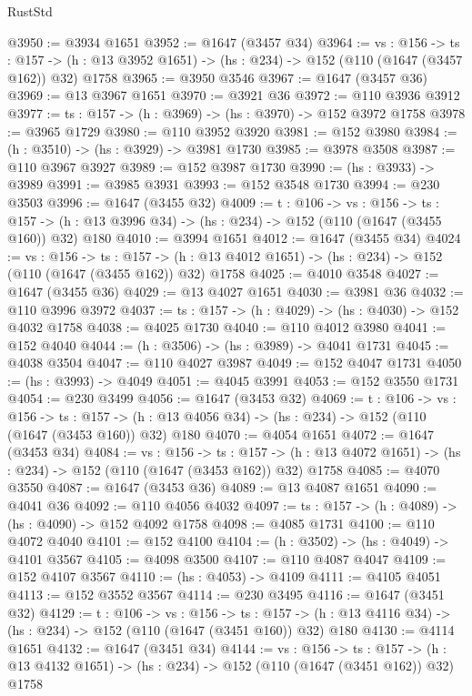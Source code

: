 \begin{lexlean}{RustStd}
\begin{coremodule}
@3950 := @3934 @1651
@3952 := @1647 (@3457 @34)
@3964 := {vs : @156} ->
  {ts : @157} -> (h : @13 @3952 @1651) -> (hs : @234) -> @152 (@110 (@1647 (@3457 @162)) @32) @1758
@3965 := @3950 @3546
@3967 := @1647 (@3457 @36)
@3969 := @13 @3967 @1651
@3970 := @3921 @36
@3972 := @110 @3936 @3912
@3977 := {ts : @157} -> (h : @3969) -> (hs : @3970) -> @152 @3972 @1758
@3978 := @3965 @1729
@3980 := @110 @3952 @3920
@3981 := @152 @3980
@3984 := (h : @3510) -> (hs : @3929) -> @3981 @1730
@3985 := @3978 @3508
@3987 := @110 @3967 @3927
@3989 := @152 @3987 @1730
@3990 := (hs : @3933) -> @3989
@3991 := @3985 @3931
@3993 := @152 @3548 @1730
@3994 := @230 @3503
@3996 := @1647 (@3455 @32)
@4009 := {t : @106} ->
  {vs : @156} ->
  {ts : @157} -> (h : @13 @3996 @34) -> (hs : @234) -> @152 (@110 (@1647 (@3455 @160)) @32) @180
@4010 := @3994 @1651
@4012 := @1647 (@3455 @34)
@4024 := {vs : @156} ->
  {ts : @157} -> (h : @13 @4012 @1651) -> (hs : @234) -> @152 (@110 (@1647 (@3455 @162)) @32) @1758
@4025 := @4010 @3548
@4027 := @1647 (@3455 @36)
@4029 := @13 @4027 @1651
@4030 := @3981 @36
@4032 := @110 @3996 @3972
@4037 := {ts : @157} -> (h : @4029) -> (hs : @4030) -> @152 @4032 @1758
@4038 := @4025 @1730
@4040 := @110 @4012 @3980
@4041 := @152 @4040
@4044 := (h : @3506) -> (hs : @3989) -> @4041 @1731
@4045 := @4038 @3504
@4047 := @110 @4027 @3987
@4049 := @152 @4047 @1731
@4050 := (hs : @3993) -> @4049
@4051 := @4045 @3991
@4053 := @152 @3550 @1731
@4054 := @230 @3499
@4056 := @1647 (@3453 @32)
@4069 := {t : @106} ->
  {vs : @156} ->
  {ts : @157} -> (h : @13 @4056 @34) -> (hs : @234) -> @152 (@110 (@1647 (@3453 @160)) @32) @180
@4070 := @4054 @1651
@4072 := @1647 (@3453 @34)
@4084 := {vs : @156} ->
  {ts : @157} -> (h : @13 @4072 @1651) -> (hs : @234) -> @152 (@110 (@1647 (@3453 @162)) @32) @1758
@4085 := @4070 @3550
@4087 := @1647 (@3453 @36)
@4089 := @13 @4087 @1651
@4090 := @4041 @36
@4092 := @110 @4056 @4032
@4097 := {ts : @157} -> (h : @4089) -> (hs : @4090) -> @152 @4092 @1758
@4098 := @4085 @1731
@4100 := @110 @4072 @4040
@4101 := @152 @4100
@4104 := (h : @3502) -> (hs : @4049) -> @4101 @3567
@4105 := @4098 @3500
@4107 := @110 @4087 @4047
@4109 := @152 @4107 @3567
@4110 := (hs : @4053) -> @4109
@4111 := @4105 @4051
@4113 := @152 @3552 @3567
@4114 := @230 @3495
@4116 := @1647 (@3451 @32)
@4129 := {t : @106} ->
  {vs : @156} ->
  {ts : @157} -> (h : @13 @4116 @34) -> (hs : @234) -> @152 (@110 (@1647 (@3451 @160)) @32) @180
@4130 := @4114 @1651
@4132 := @1647 (@3451 @34)
@4144 := {vs : @156} ->
  {ts : @157} -> (h : @13 @4132 @1651) -> (hs : @234) -> @152 (@110 (@1647 (@3451 @162)) @32) @1758

\end{coremodule}
\end{lexlean}
